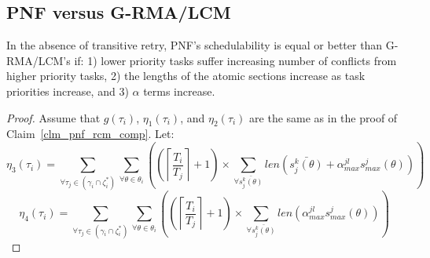 \subsection{PNF versus G-RMA/LCM}

\begin{clm}\label{sub:pnf_lcm_rma_comp}
%
In the absence of transitive retry, PNF's schedulability is equal or better than G-RMA/LCM's if: 1) lower priority tasks suffer increasing number of conflicts from higher priority tasks, 2) the lengths of the atomic sections increase as task priorities increase, and 3) $\alpha$ terms increase.
%
\end{clm}
\begin{proof}\normalfont
Assume that $g(\tau_{i})$, $\eta_{1}(\tau_{i})$, and $\eta_{2}(\tau_{i})$ are the same as in the proof of Claim~\ref{clm_pnf_rcm_comp}. Let:
\begin{equation*}
\eta_{3}(\tau_{i}) = \sum_{\forall\tau_{j}\in(\gamma_{i}\cap\zeta_{i}^{*})}\sum_{\forall\theta\in\theta_{i}}\left(\left(\left\lceil \frac{T_{i}}{T_{j}}\right\rceil +1\right)\times \sum_{\forall\bar{s_{j}^{k}(\theta)}}len\left(\bar{s_{j}^{k}(\theta)}+\alpha_{max}^{jl}s_{max}^{j}(\theta)\right)\right)
\end{equation*}
\begin{equation*}
\eta_{4}(\tau_{i}) = \sum_{\forall\tau_{j}\in(\gamma_{i}\cap\zeta_{i}^{*})}\sum_{\forall\theta\in\theta_{i}}\left(\left(\left\lceil \frac{T_{i}}{T_{j}}\right\rceil +1\right) \times \sum_{\forall\bar{s_{j}^{k}(\theta)}}len\left(\alpha_{max}^{jl}s_{max}^{j}(\theta)\right)\right)
\end{equation*}


\end{proof}
